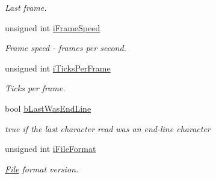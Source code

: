 \begin{DoxyCompactItemize}
\begin{DoxyCompactList}\small\item\em Last frame. \end{DoxyCompactList}\item 
\hypertarget{class_assimp_1_1_a_s_e_1_1_parser_a05e7c5516cfa27a06a45684a53ab6394}{unsigned int \hyperlink{class_assimp_1_1_a_s_e_1_1_parser_a05e7c5516cfa27a06a45684a53ab6394}{i\+Frame\+Speed}}\label{class_assimp_1_1_a_s_e_1_1_parser_a05e7c5516cfa27a06a45684a53ab6394}

\begin{DoxyCompactList}\small\item\em Frame speed -\/ frames per second. \end{DoxyCompactList}\item 
\hypertarget{class_assimp_1_1_a_s_e_1_1_parser_a320e1d1688899fea40bee730c075f07b}{unsigned int \hyperlink{class_assimp_1_1_a_s_e_1_1_parser_a320e1d1688899fea40bee730c075f07b}{i\+Ticks\+Per\+Frame}}\label{class_assimp_1_1_a_s_e_1_1_parser_a320e1d1688899fea40bee730c075f07b}

\begin{DoxyCompactList}\small\item\em Ticks per frame. \end{DoxyCompactList}\item 
\hypertarget{class_assimp_1_1_a_s_e_1_1_parser_a82349e13ab9171b968062f7978541798}{bool \hyperlink{class_assimp_1_1_a_s_e_1_1_parser_a82349e13ab9171b968062f7978541798}{b\+Last\+Was\+End\+Line}}\label{class_assimp_1_1_a_s_e_1_1_parser_a82349e13ab9171b968062f7978541798}

\begin{DoxyCompactList}\small\item\em true if the last character read was an end-\/line character \end{DoxyCompactList}\item 
\hypertarget{class_assimp_1_1_a_s_e_1_1_parser_ae65d37652816513ac1f019a095676b2a}{unsigned int \hyperlink{class_assimp_1_1_a_s_e_1_1_parser_ae65d37652816513ac1f019a095676b2a}{i\+File\+Format}}\label{class_assimp_1_1_a_s_e_1_1_parser_ae65d37652816513ac1f019a095676b2a}

\begin{DoxyCompactList}\small\item\em \hyperlink{class_file}{File} format version. \end{DoxyCompactList}\end{DoxyCompactItemize}


